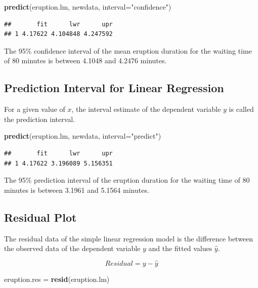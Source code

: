 \documentclass[]{article}
\newenvironment{Shaded}{\begin{snugshade}}{\end{snugshade}}
\newcommand{\KeywordTok}[1]{\textcolor[rgb]{0.13,0.29,0.53}{\textbf{{#1}}}}
\newcommand{\DataTypeTok}[1]{\textcolor[rgb]{0.13,0.29,0.53}{{#1}}}
\newcommand{\StringTok}[1]{\textcolor[rgb]{0.31,0.60,0.02}{{#1}}}
\newcommand{\NormalTok}[1]{{#1}}
\numberwithin{equation}{section}
\begin{document}
\begin{Shaded}
\begin{Highlighting}[]
\KeywordTok{predict}\NormalTok{(eruption.lm, newdata, }\DataTypeTok{interval=}\StringTok{"confidence"}\NormalTok{) }
\end{Highlighting}
\end{Shaded}

\begin{verbatim}
##       fit      lwr      upr
## 1 4.17622 4.104848 4.247592
\end{verbatim}

The 95\% confidence interval of the mean eruption duration for the
waiting time of 80 minutes is between 4.1048 and 4.2476 minutes.

\subsection{Prediction Interval for Linear
Regression}\label{prediction-interval-for-linear-regression}

For a given value of \(x\), the interval estimate of the dependent
variable \(y\) is called the prediction interval.

\begin{Shaded}
\begin{Highlighting}[]
\KeywordTok{predict}\NormalTok{(eruption.lm, newdata, }\DataTypeTok{interval=}\StringTok{"predict"}\NormalTok{) }
\end{Highlighting}
\end{Shaded}

\begin{verbatim}
##       fit      lwr      upr
## 1 4.17622 3.196089 5.156351
\end{verbatim}

The 95\% prediction interval of the eruption duration for the waiting
time of 80 minutes is between 3.1961 and 5.1564 minutes.

\subsection{Residual Plot}\label{residual-plot}

The residual data of the simple linear regression model is the
difference between the observed data of the dependent variable \(y\) and
the fitted values \(\hat{y}\).

\[
    Residual = y -\hat{y}
\]

\begin{Shaded}
\begin{Highlighting}[]
\NormalTok{eruption.res =}\StringTok{ }\KeywordTok{resid}\NormalTok{(eruption.lm) }
\end{Highlighting}
\end{Shaded}
\end{document}

